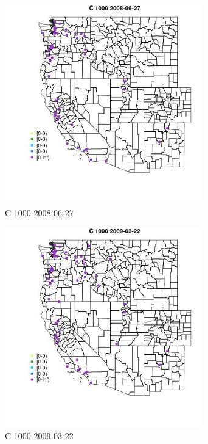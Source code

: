 \begin{figure} 
\centering  
\includegraphics[width=0.77\textwidth]{Code_Outputs/Report_ML_input_PM25_Step4_part_e_de_duplicated_aves_MapObsC_10002008-06-27.jpg} 
\caption{\label{fig:Report_ML_input_PM25_Step4_part_e_de_duplicated_avesMapObsC_10002008-06-27}C 1000 2008-06-27} 
\end{figure} 
 

\clearpage 

\begin{figure} 
\centering  
\includegraphics[width=0.77\textwidth]{Code_Outputs/Report_ML_input_PM25_Step4_part_e_de_duplicated_aves_MapObsC_10002009-03-22.jpg} 
\caption{\label{fig:Report_ML_input_PM25_Step4_part_e_de_duplicated_avesMapObsC_10002009-03-22}C 1000 2009-03-22} 
\end{figure} 
 

